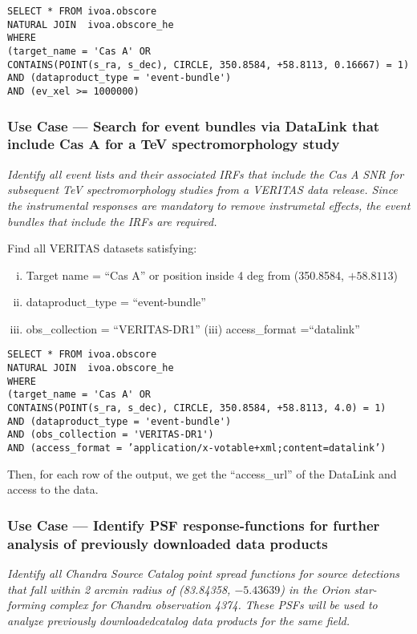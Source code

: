 \begin{verbatim}
SELECT * FROM ivoa.obscore
NATURAL JOIN  ivoa.obscore_he 
WHERE
(target_name = 'Cas A' OR
CONTAINS(POINT(s_ra, s_dec), CIRCLE, 350.8584, +58.8113, 0.16667) = 1) 
AND (dataproduct_type = 'event-bundle')
AND (ev_xel >= 1000000)
\end{verbatim}

\subsubsection{Use Case --- Search for event bundles via DataLink that include Cas A for a TeV spectromorphology study}

{\em Identify all event lists and their associated \glspl{IRF} that include the Cas A SNR for subsequent TeV spectromorphology studies from a VERITAS data release. Since the instrumental responses are mandatory to remove instrumetal effects, the event bundles that include the  \glspl{IRF} are required.\/}

\medskip
\noindent Find all VERITAS datasets satisfying:
\begin{enumerate}[(i)]
  \item Target name = ``Cas A'' or position inside 4 deg from (350.8584, $+58.8113$)
  \item dataproduct\_type = ``event-bundle''
  \item obs\_collection = ``VERITAS-DR1''
  (iii) access\_format =``datalink''
\end{enumerate}

\begin{verbatim}
SELECT * FROM ivoa.obscore
NATURAL JOIN  ivoa.obscore_he
WHERE
(target_name = 'Cas A' OR
CONTAINS(POINT(s_ra, s_dec), CIRCLE, 350.8584, +58.8113, 4.0) = 1) 
AND (dataproduct_type = 'event-bundle')
AND (obs_collection = 'VERITAS-DR1')
AND (access_format = ’application/x-votable+xml;content=datalink’)
\end{verbatim}

Then, for each row of the output, we get the ``access\_url'' of the DataLink and access to the data.

\subsubsection{Use Case --- Identify PSF response-functions for further analysis of previously downloaded data products}

{\em Identify all Chandra Source Catalog point spread functions for source detections that fall within 2 arcmin radius of  (83.84358, $-5.43639$) in the Orion star-forming complex for Chandra observation 4374.  These PSFs will be used to analyze previously downloadedcatalog data products for the same field.\/ }

